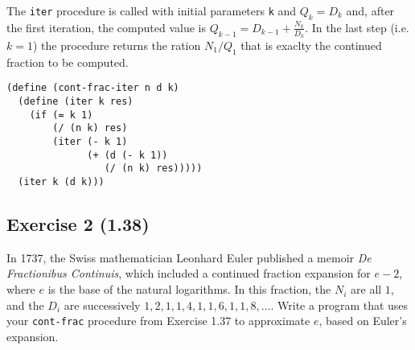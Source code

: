 \begin{itemize}
        The \texttt{iter} procedure is called with initial parameters \texttt{k} and $ Q_{k} = D_{k} $ and, after the first 
        iteration, the computed value is $ Q_{k - 1} = D_{k - 1} + \frac{N_{k}}{D_{k}} $.
        In the last step (i.e. $ k = 1 $) the procedure returns the ration $ N_{1} / Q_{1} $ that is exaclty the continued fraction
        to be computed.
\begin{lstlisting}[caption={Iterative process for the function \texttt{cont-frac}}, captionpos=b]
(define (cont-frac-iter n d k)
  (define (iter k res)
    (if (= k 1)
        (/ (n k) res)
        (iter (- k 1)
              (+ (d (- k 1))
                 (/ (n k) res)))))
  (iter k (d k)))
\end{lstlisting}   
\end{itemize}


\subsection*{Exercise 2 (1.38)}
In 1737, the Swiss mathematician Leonhard Euler published a memoir \textit{De Fractionibus Continuis}, which
included a continued fraction expansion for $ e - 2 $, where $ e $ is the base of the natural logarithms.
In this fraction, the $ N_{i} $ are all $ 1 $, and the $ D_{i} $ are successively $ 1, 2, 1, 1, 4, 1, 1, 6, 1, 1, 8, \dots $.
Write a program that uses your \texttt{cont-frac} procedure from Exercise 1.37 to approximate $ e $, based on Euler's expansion.

